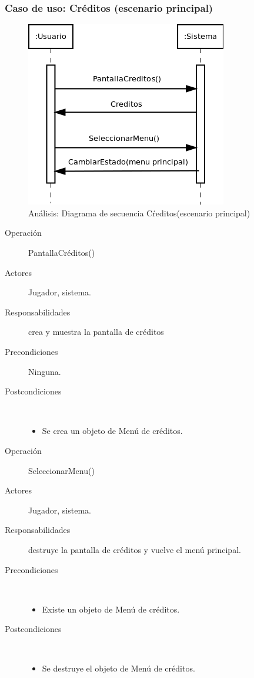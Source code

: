 \subsubsection{Caso de uso: Créditos (escenario principal)}

\begin{figure}[H] 
  \label{secuencia_creditos}
  \begin{center}
    \includegraphics[scale=0.6]{imagenes/analisis/secuencia_creditos.png}
  \end{center}
  \caption{Análisis: Diagrama de secuencia Cŕeditos(escenario principal)}
\end{figure}

\begin{description}
    \item [Operación] PantallaCréditos()
    \item [Actores] Jugador, sistema.
    \item [Responsabilidades] crea y muestra la pantalla de créditos
    \item [Precondiciones] Ninguna.
    \item [Postcondiciones] $\quad$
        \begin{itemize}
            \item Se crea un objeto de Menú de créditos.
        \end{itemize}
\end{description}

\begin{description}
    \item [Operación] SeleccionarMenu()
    \item [Actores] Jugador, sistema.
    \item [Responsabilidades] destruye la pantalla de créditos y vuelve el menú principal.
    \item [Precondiciones] $\quad$
        \begin{itemize}
            \item Existe un objeto de Menú de créditos.
        \end{itemize}
    \item [Postcondiciones] $\quad$
        \begin{itemize}
            \item Se destruye el objeto de Menú de créditos.
        \end{itemize}
\end{description}
